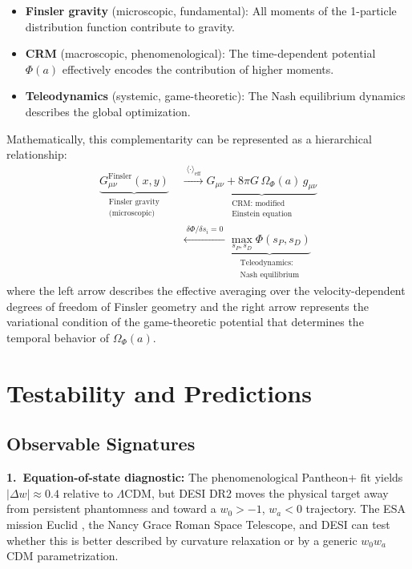 \documentclass[aps,prd,twocolumn,superscriptaddress,nofootinbib]{revtex4-2}
\begin{document}
\begin{itemize}
\item \textbf{Finsler gravity} (microscopic, fundamental): All moments of the 1-particle distribution function contribute to gravity.
\item \textbf{CRM} (macroscopic, phenomenological): The time-dependent potential $\Phi(a)$ effectively encodes the contribution of higher moments.
\item \textbf{Teleodynamics} (systemic, game-theoretic): The Nash equilibrium dynamics describes the global optimization.
\end{itemize}

Mathematically, this complementarity can be represented as a hierarchical relationship:
\begin{equation}
\begin{split}
\underbrace{G_{\mu\nu}^{\mathrm{Finsler}}(x, y)}_{\substack{\text{Finsler gravity}\\\text{(microscopic)}}}
&\;\xrightarrow{\;\langle\cdot\rangle_{\mathrm{eff}}\;}
\underbrace{G_{\mu\nu} + 8\pi G\,\Omega_\Phi(a)\,g_{\mu\nu}}_{\substack{\text{CRM: modified}\\\text{Einstein equation}}} \\
&\;\xleftarrow{\;\delta\Phi/\delta s_i = 0\;}
\underbrace{\max_{s_P, s_D} \Phi(s_P, s_D)}_{\substack{\text{Teleodynamics:}\\\text{Nash equilibrium}}}
\end{split}
\label{eq:complementarity}
\end{equation}
where the left arrow describes the effective averaging over the velocity-dependent degrees of freedom of Finsler geometry and the right arrow represents the variational condition of the game-theoretic potential that determines the temporal behavior of $\Omega_\Phi(a)$.


\section{Testability and Predictions}
\label{sec:testability}

\subsection{Observable Signatures}

\textbf{1.~Equation-of-state diagnostic:} The phenomenological Pantheon+ fit yields $|\Delta w| \approx 0.4$ relative to $\Lambda$CDM, but DESI DR2 moves the physical target away from persistent phantomness and toward a $w_0>-1$, $w_a<0$ trajectory. The ESA mission Euclid \cite{Euclid2024}, the Nancy Grace Roman Space Telescope, and DESI can test whether this is better described by curvature relaxation or by a generic $w_0w_a$CDM parametrization.
\end{document}

